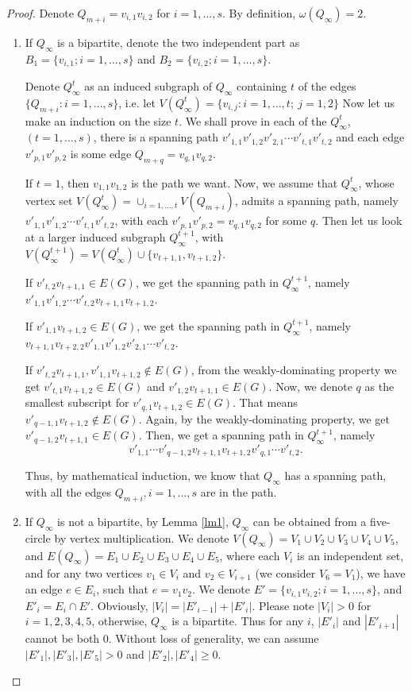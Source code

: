 \documentclass[12pt]{article}
\begin{document}
\begin{proof}
Denote $Q_{m+i}=v_{i,1}v_{i,2}$ for $i=1,\ldots,s$. By definition, $\omega(Q_{\infty})=2$.
\begin{enumerate}

\item If $Q_{\infty}$ is a bipartite, denote the two independent part as $B_1=\{v_{i,1};i=1,\ldots,s\}$ and $B_2=\{v_{i,2};i=1,\ldots,s\}$. 


Denote $Q^t_{\infty}$ as an induced subgraph of $Q_{\infty}$ containing $t$ of the edges $\{Q_{m+i}:i=1,\ldots,s\}$, i.e. let $V(Q^t_{\infty})=\{v_{i,j}:i=1,\ldots,t;~j=1,2\}$
Now let us make an induction on the size $t$. We shall prove in each of the $Q^t_{\infty}$, $(t=1,\ldots,s)$, there is a spanning path $v'_{1,1}v'_{1,2}v'_{2,1}\cdots v'_{t,1}v'_{t,2}$ and each edge $v'_{p,1}v'_{p,2}$ is some edge $Q_{m+q}=v_{q,1}v_{q,2}$.


If $t=1$, then $v_{1,1}v_{1,2}$ is the path we want. Now, we assume that $Q^t_{\infty}$, whose vertex set $V(Q^t_{\infty})=\cup_{i=1,\ldots,t}V(Q_{m+i})$, admits a spanning path, namely $v'_{1,1}v'_{1,2}\cdots v'_{t,1}v'_{t,2}$, with each $v'_{p,1}v'_{p,2}=v_{q,1}v_{q,2}$ for some $q$. Then let us look at a larger induced subgraph $Q^{t+1}_{\infty}$, with $V(Q^{t+1}_{\infty})=V(Q^t_{\infty})\cup\{v_{t+1,1},v_{t+1,2}\}$.

If $v'_{t,2}v_{t+1,1}\in E(G)$, we get the spanning path in $Q^{t+1}_{\infty}$, namely $v'_{1,1}v'_{1,2}\cdots v'_{t,2}v_{t+1,1}v_{t+1,2}$.

If $v'_{1,1}v_{t+1,2}\in E(G)$, we get the spanning path in $Q^{t+1}_{\infty}$, namely $v_{t+1,1}v_{t+2,2}v'_{1,1}v'_{1,2}v'_{2,1}\cdots v'_{t,2}$.

If $v'_{t,2}v_{t+1,1},v'_{1,1}v_{t+1,2}\not\in E(G)$, from the weakly-dominating property we get $v'_{t,1}v_{t+1,2}\in E(G)$ and $v'_{1,2}v_{t+1,1}\in E(G)$. Now, we denote $q$ as the smallest subscript for $v'_{q,1}v_{t+1,2}\in E(G)$. That means $v'_{q-1,1}v_{t+1,2}\not\in E(G)$. Again, by the weakly-dominating property, we get $v'_{q-1,2}v_{t+1,1}\in E(G)$. Then, we get a spanning path in $Q^{t+1}_{\infty}$, namely $$v'_{1,1}\cdots v'_{q-1,2}v_{t+1,1}v_{t+1,2}v'_{q,1}\cdots v'_{t,2}.$$

Thus, by mathematical induction, we know that $Q_{\infty}$ has a spanning path, with all the edges $Q_{m+i},i=1,\ldots,s$ are in the path.

\item If $Q_{\infty}$ is not a bipartite, by Lemma \ref{lm1}, $Q_{\infty}$ can be obtained from a five-circle by vertex multiplication. We denote $V(Q_{\infty})=V_1\cup V_2\cup V_3\cup V_4\cup V_5$, and $E(Q_{\infty})=E_1\cup E_2\cup E_3\cup E_4\cup E_5$, where each $V_i$ is an independent set, and  for any two vertices $v_1\in V_i$ and $v_2\in V_{i+1}$ (we consider $V_6=V_1$), we have an edge $e\in E_i$, such that $e=v_1v_2$. We denote $E'=\{v_{i,1}v_{i,2};i=1,\ldots,s\}$, and $E'_i=E_i\cap E'$. Obviously, $|V_i|=|E'_{i-1}|+|E'_i|$. Please note $|V_i|>0$ for $i=1,2,3,4,5$, otherwise, $Q_{\infty}$ is a bipartite. Thus for any $i$, $|E'_i|$ and $|E'_{i+1}|$ cannot be both 0. Without loss of generality, we can assume $|E'_1|,|E'_3|,|E'_5|>0$ and $|E'_2|,|E'_4|\ge0$.


\end{enumerate}
\end{proof}
\end{document}
